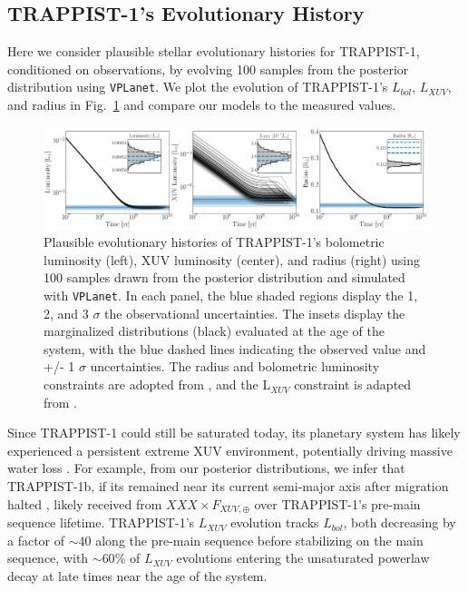 \documentclass[twocolumn]{aastex62}
\newcommand{\vplanet}[0]{\texttt{VPLanet}\xspace}
\begin{document}
\subsection{TRAPPIST-1's Evolutionary History}

Here we consider plausible stellar evolutionary histories for TRAPPIST-1, conditioned on observations, by evolving 100 samples from the posterior distribution using \vplanet. We plot the evolution of TRAPPIST-1's $L_{bol}$, $L_{XUV}$, and radius in Fig.~\ref{fig:evol} and compare our models to the measured values. 

\begin{figure}[t]
	\includegraphics[width=\textwidth]{../Analysis/Evol/trappist1Evol.pdf}
   \caption{Plausible evolutionary histories of TRAPPIST-1's bolometric luminosity (left), XUV luminosity (center), and radius (right) using 100 samples drawn from the posterior distribution and simulated with \vplanet. In each panel, the blue shaded regions display the 1, 2, and 3 $\sigma$ the observational uncertainties. The insets display the marginalized distributions (black) evaluated at the age of the system, with the blue dashed lines indicating the observed value and +/- 1 $\sigma$ uncertainties. The radius and bolometric luminosity constraints are adopted from \citet{vanGrootel2018}, and the L$_{XUV}$ constraint is adapted from \citet{Wheatley2017}.}%
    \label{fig:evol}%
\end{figure}

Since TRAPPIST-1 could still be saturated today, its planetary system has likely experienced a persistent extreme XUV environment, potentially driving massive water loss \citep[][Fleming et al., in prep]{Luger2015,Bolmont2017,Bourrier2017a}. For example, from our posterior distributions, we infer that TRAPPIST-1b, if its remained near its current semi-major axis after migration halted \citep{Luger2017}, likely received from $XXX \times F_{XUV, \oplus}$ over TRAPPIST-1's pre-main sequence lifetime. TRAPPIST-1's $L_{XUV}$ evolution tracks $L_{bol}$, both decreasing by a factor of ${\sim}40$ along the pre-main sequence before stabilizing on the main sequence, with ${\sim}60\%$ of $L_{XUV}$ evolutions entering the unsaturated powerlaw decay at late times near the age of the system. 
\end{document}
